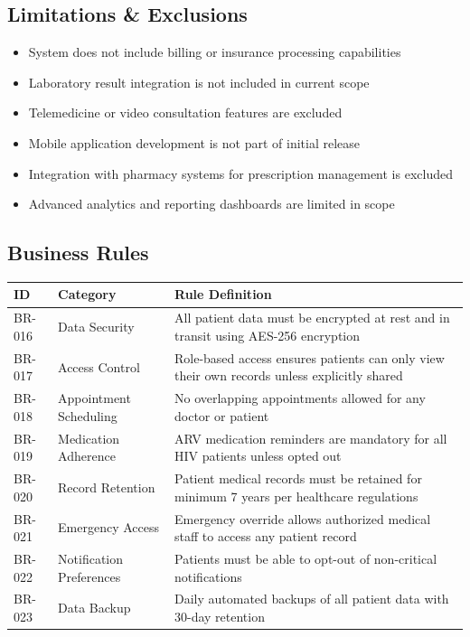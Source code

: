 \documentclass[12pt,a4paper]{article}
\begin{document}
\subsection{Limitations \& Exclusions}

\begin{itemize}
    \item System does not include billing or insurance processing capabilities
    \item Laboratory result integration is not included in current scope
    \item Telemedicine or video consultation features are excluded
    \item Mobile application development is not part of initial release
    \item Integration with pharmacy systems for prescription management is excluded
    \item Advanced analytics and reporting dashboards are limited in scope
\end{itemize}

\subsection{Business Rules}

\begin{longtable}{|p{2cm}|p{3cm}|p{9cm}|}
\hline
\textbf{ID} & \textbf{Category} & \textbf{Rule Definition} \\
\hline
BR-016 & Data Security & All patient data must be encrypted at rest and in transit using AES-256 encryption \\
\hline
BR-017 & Access Control & Role-based access ensures patients can only view their own records unless explicitly shared \\
\hline
BR-018 & Appointment Scheduling & No overlapping appointments allowed for any doctor or patient \\
\hline
BR-019 & Medication Adherence & ARV medication reminders are mandatory for all HIV patients unless opted out \\
\hline
BR-020 & Record Retention & Patient medical records must be retained for minimum 7 years per healthcare regulations \\
\hline
BR-021 & Emergency Access & Emergency override allows authorized medical staff to access any patient record \\
\hline
BR-022 & Notification Preferences & Patients must be able to opt-out of non-critical notifications \\
\hline
BR-023 & Data Backup & Daily automated backups of all patient data with 30-day retention \\
\hline
\end{longtable}
\end{document}
